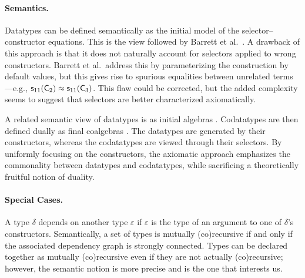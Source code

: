 



\paragraph{Semantics.}
Datatypes can be defined semantically as the initial model of the
selector--constructor equations. This is the view followed by Barrett et al.\
\cite{barrett-et-al-2010}. A drawback of this approach is that it does
not naturally account for selectors applied to wrong constructors. Barrett et
al.\ address this by parameterizing the construction by default values, but
this gives rise to spurious equalities between unrelated terms---e.g.,
$\textsf{s}_{11}(\textsf{C}_2) \approx \textsf{s}_{11}(\textsf{C}_3)$. This flaw
could be corrected, but the added complexity seems to suggest that selectors
are better characterized axiomatically.

A related semantic view of datatypes is as initial algebras \cite{xxx}.
Codatatypes are then defined dually as final coalgebras \cite{xxx}. The
datatypes are generated by their constructors, whereas the codatatypes are
viewed through their selectors. By uniformly focusing on the constructors, the
axiomatic approach emphasizes the commonality between datatypes and
codatatypes, while sacrificing a theoretically fruitful notion of duality.

\paragraph{Special Cases.}
A type $\delta$ depends on another type $\varepsilon$ if $\varepsilon$ is the
type of an argument to one of $\delta$'s constructors. Semantically, a set of
types is mutually (co)recursive if and only if the associated dependency graph
is strongly connected. Types can be declared together as mutually
(co)recursive even if they are not actually (co)recursive; however, the
semantic notion is more precise and is the one that interests us.


